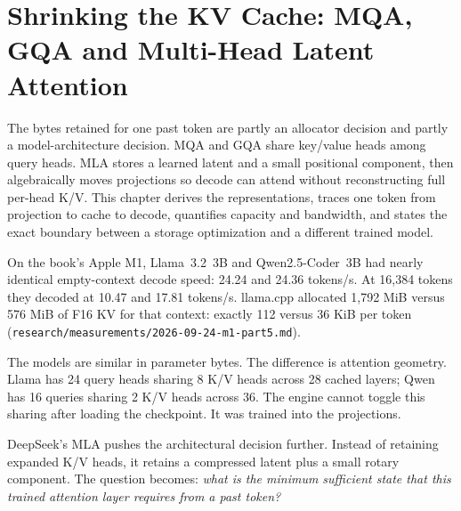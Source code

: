 \chapter{Shrinking the KV Cache: MQA, GQA and Multi-Head Latent Attention}\label{ch:shrinking-kv}

\begin{ChapterIntent}
The bytes retained for one past token are partly an allocator decision and partly a
model-architecture decision. MQA and GQA share key/value heads among query heads. MLA
stores a learned latent and a small positional component, then algebraically moves
projections so decode can attend without reconstructing full per-head K/V. This chapter
derives the representations, traces one token from projection to cache to decode,
quantifies capacity and bandwidth, and states the exact boundary between a storage
optimization and a different trained model.
\end{ChapterIntent}


On the book's Apple M1, Llama~3.2~3B and Qwen2.5-Coder~3B had nearly identical
empty-context decode speed: 24.24 and 24.36 tokens/s. At 16,384 tokens they decoded at
10.47 and 17.81 tokens/s. llama.cpp allocated 1,792 MiB versus 576 MiB of F16 KV for
that context: exactly 112 versus 36 KiB per token
(\texttt{research/measurements/2026-09-24-m1-part5.md}).

The models are similar in parameter bytes. The difference is attention geometry.
Llama has 24 query heads sharing 8 K/V heads across 28 cached layers; Qwen has 16
queries sharing 2 K/V heads across 36. The engine cannot toggle this sharing after
loading the checkpoint. It was trained into the projections.

DeepSeek's MLA pushes the architectural decision further. Instead of retaining
expanded K/V heads, it retains a compressed latent plus a small rotary component. The
question becomes: \emph{what is the minimum sufficient state that this trained
attention layer requires from a past token?}


